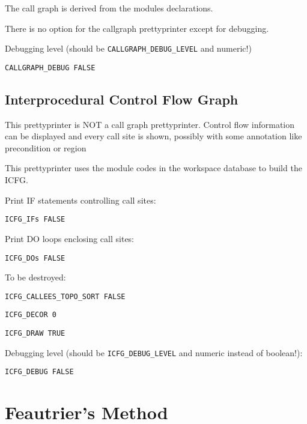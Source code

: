 The call graph is derived from the modules declarations.

There is no option for the callgraph prettyprinter except
for debugging.

Debugging level (should be \verb+CALLGRAPH_DEBUG_LEVEL+ and numeric!)

\begin{verbatim}
CALLGRAPH_DEBUG FALSE
\end{verbatim}

\subsection{Interprocedural Control Flow Graph}

This prettyprinter is NOT a call graph prettyprinter. Control flow
information can be displayed and every call site is shown, possibly with
some annotation like precondition or region

This prettyprinter uses the module codes in the workspace database to
build the ICFG.

Print IF statements controlling call sites:

\begin{verbatim}
ICFG_IFs FALSE
\end{verbatim}

Print DO loops enclosing call sites:

\begin{verbatim}
ICFG_DOs FALSE
\end{verbatim}

To be destroyed:

\begin{verbatim}
ICFG_CALLEES_TOPO_SORT FALSE
\end{verbatim}

\begin{verbatim}
ICFG_DECOR 0
\end{verbatim}

\begin{verbatim}
ICFG_DRAW TRUE
\end{verbatim}

Debugging level (should be \verb+ICFG_DEBUG_LEVEL+ and numeric instead
of boolean!):

\begin{verbatim}
ICFG_DEBUG FALSE
\end{verbatim}

\section{Feautrier's Method}

